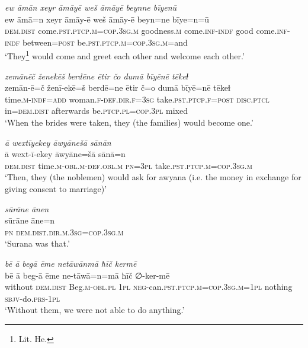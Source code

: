 \ea \label{RE.25}
\textit{ew āmān xeyr āmāyē weš āmāyē beynne bīyenū} \\ 
\gll ew āmā=n xeyr āmāy-ē weš āmāy-ē beyn=ne bīye=n=ū \\ 
 \textsc{dem.dist} come\textsc{.pst}\textsc{.ptcp}\textsc{.m}\textsc{=cop}\textsc{.3sg}\textsc{.m} goodness\textsc{.m} come\textsc{.inf}\textsc{-indf} good come\textsc{.inf}\textsc{-indf} between\textsc{=\textsc{post}} be\textsc{.pst}\textsc{.ptcp}\textsc{.m}\textsc{=cop}\textsc{.3sg}\textsc{.m}=and \\ 
\glt `They\footnote{Lit. He.} would come and greet each other and welcome each other.'
\z 
 
\ea \label{RE.26}
\textit{zemānēč ženekēš berdēne ētir čo dumā bīyēnē tēkeɫ} \\ 
\gll zemān-ē=č ženī-ekē=š berdē=ne ētir č=o dumā bīyē=nē tēkeɫ \\ 
 time\textsc{.m}\textsc{-indf}\textsc{=add} woman\textsc{.f}\textsc{-def}\textsc{.dir}\textsc{.f}\textsc{=3sg} take\textsc{.pst}\textsc{.ptcp}\textsc{.f}\textsc{=\textsc{post}} \textsc{disc.ptcl} in=\textsc{dem.dist} afterwards be\textsc{.ptcp}\textsc{.pl}\textsc{=cop}\textsc{.3pl} mixed \\ 
\glt `When the brides were taken, they (the families) would become one.'
\z 
 
\ea \label{RE.58}
\textit{ā wextīyekey āwyānešā sānān} \\ 
\gll ā wext-ī-ekey āwyāne=šā sānā=n \\ 
 \textsc{dem.dist} time\textsc{.m}\textsc{-obl}\textsc{.m}\textsc{-def}\textsc{.obl}\textsc{.m} \textsc{pn}\textsc{=3pl} take\textsc{.pst}\textsc{.ptcp}\textsc{.m}\textsc{=cop}\textsc{.3sg}\textsc{.m} \\ 
\glt `Then, they (the noblemen) would ask for awyana (i.e. the money in exchange for giving consent to marriage)'
\z 
 
\ea \label{RE.61}
\textit{sūrāne ānen} \\ 
\gll sūrāne āne=n \\ 
 \textsc{pn} \textsc{dem.dist}\textsc{.dir}\textsc{.m}\textsc{.3sg}\textsc{=cop}\textsc{.3sg}\textsc{.m} \\ 
\glt `Surana was that.'
\z 
 
\ea \label{RE.64}
\textit{bē ā begā ēme netāwānmā ħīč kermē} \\ 
\gll bē ā beg-ā ēme ne-tāwā=n=mā ħīč ∅-ker-mē \\ 
 without \textsc{dem.dist} Beg\textsc{.m}\textsc{-obl}\textsc{.pl} \textsc{1pl} \textsc{neg-}can\textsc{.pst}\textsc{.ptcp}\textsc{.m}\textsc{=cop}\textsc{.3sg}\textsc{.m}\textsc{=\textsc{1pl}} nothing \textsc{sbjv-}do\textsc{.prs}\textsc{-\textsc{1pl}} \\ 
\glt `Without them, we were not able to do anything.'
\z 
 
